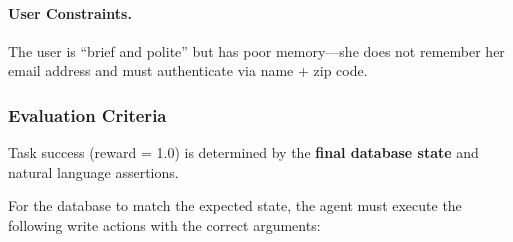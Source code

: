 \paragraph{User Constraints.} The user is ``brief and polite'' but has poor memory---she does not remember her email address and must authenticate via name + zip code.

\subsubsection{Evaluation Criteria}

Task success (reward = 1.0) is determined by the \textbf{final database state} and natural language assertions. 

For the database to match the expected state, the agent must execute the following write actions with the correct arguments:

